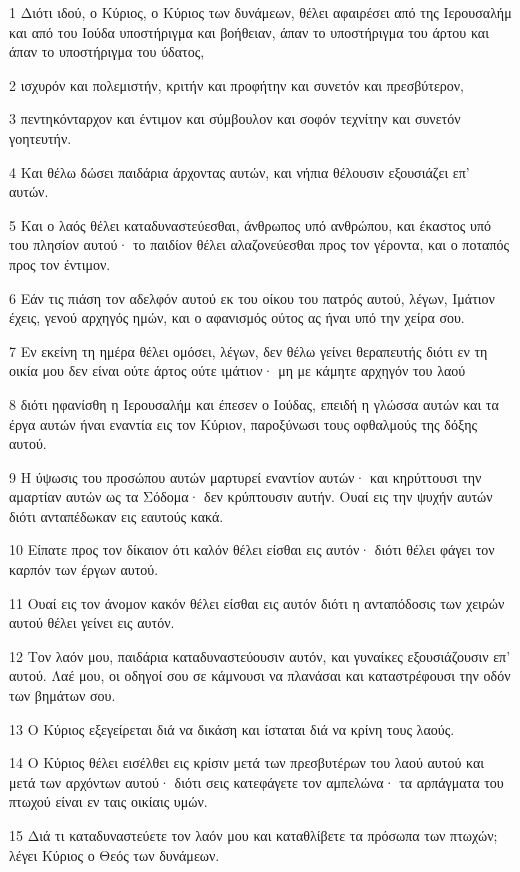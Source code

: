 \par 1 Διότι ιδού, ο Κύριος, ο Κύριος των δυνάμεων, θέλει αφαιρέσει από της Ιερουσαλήμ και από του Ιούδα υποστήριγμα και βοήθειαν, άπαν το υποστήριγμα του άρτου και άπαν το υποστήριγμα του ύδατος,
\par 2 ισχυρόν και πολεμιστήν, κριτήν και προφήτην και συνετόν και πρεσβύτερον,
\par 3 πεντηκόνταρχον και έντιμον και σύμβουλον και σοφόν τεχνίτην και συνετόν γοητευτήν.
\par 4 Και θέλω δώσει παιδάρια άρχοντας αυτών, και νήπια θέλουσιν εξουσιάζει επ' αυτών.
\par 5 Και ο λαός θέλει καταδυναστεύεσθαι, άνθρωπος υπό ανθρώπου, και έκαστος υπό του πλησίον αυτού· το παιδίον θέλει αλαζονεύεσθαι προς τον γέροντα, και ο ποταπός προς τον έντιμον.
\par 6 Εάν τις πιάση τον αδελφόν αυτού εκ του οίκου του πατρός αυτού, λέγων, Ιμάτιον έχεις, γενού αρχηγός ημών, και ο αφανισμός ούτος ας ήναι υπό την χείρα σου.
\par 7 Εν εκείνη τη ημέρα θέλει ομόσει, λέγων, δεν θέλω γείνει θεραπευτής διότι εν τη οικία μου δεν είναι ούτε άρτος ούτε ιμάτιον· μη με κάμητε αρχηγόν του λαού
\par 8 διότι ηφανίσθη η Ιερουσαλήμ και έπεσεν ο Ιούδας, επειδή η γλώσσα αυτών και τα έργα αυτών ήναι εναντία εις τον Κύριον, παροξύνωσι τους οφθαλμούς της δόξης αυτού.
\par 9 Η ύψωσις του προσώπου αυτών μαρτυρεί εναντίον αυτών· και κηρύττουσι την αμαρτίαν αυτών ως τα Σόδομα· δεν κρύπτουσιν αυτήν. Ουαί εις την ψυχήν αυτών διότι ανταπέδωκαν εις εαυτούς κακά.
\par 10 Είπατε προς τον δίκαιον ότι καλόν θέλει είσθαι εις αυτόν· διότι θέλει φάγει τον καρπόν των έργων αυτού.
\par 11 Ουαί εις τον άνομον κακόν θέλει είσθαι εις αυτόν διότι η ανταπόδοσις των χειρών αυτού θέλει γείνει εις αυτόν.
\par 12 Τον λαόν μου, παιδάρια καταδυναστεύουσιν αυτόν, και γυναίκες εξουσιάζουσιν επ' αυτού. Λαέ μου, οι οδηγοί σου σε κάμνουσι να πλανάσαι και καταστρέφουσι την οδόν των βημάτων σου.
\par 13 Ο Κύριος εξεγείρεται διά να δικάση και ίσταται διά να κρίνη τους λαούς.
\par 14 Ο Κύριος θέλει εισέλθει εις κρίσιν μετά των πρεσβυτέρων του λαού αυτού και μετά των αρχόντων αυτού· διότι σεις κατεφάγετε τον αμπελώνα· τα αρπάγματα του πτωχού είναι εν ταις οικίαις υμών.
\par 15 Διά τι καταδυναστεύετε τον λαόν μου και καταθλίβετε τα πρόσωπα των πτωχών; λέγει Κύριος ο Θεός των δυνάμεων.
